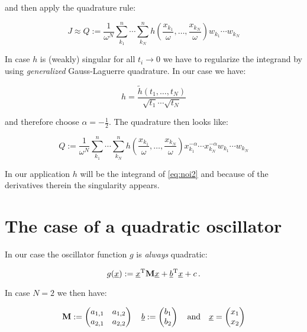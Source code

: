 \documentclass[a4paper,10pt]{article}
\begin{document}
and then apply the quadrature rule:

\begin{equation}
 J \approx Q := \frac{1}{\omega^N} \sum_{k_1}^n \cdots \sum_{k_N}^n
                h\left(\frac{x_{k_1}}{\omega}, \ldots, \frac{x_{k_N}}{\omega}\right)
                w_{k_1} \cdots w_{k_N}
\end{equation}

In case $h$ is (weakly) singular for all $t_i \rightarrow 0$ we have to regularize
the integrand by using \emph{generalized} Gauss-Laguerre quadrature. In our case
we have:

\begin{equation}
 h = \frac{\tilde{h}(t_1,\ldots,t_N)}{\sqrt{t_1}\cdots\sqrt{t_N}}
\end{equation}

and therefore choose $\alpha = -\frac{1}{2}$. The quadrature then looks like:

\begin{equation}
 Q := \frac{1}{\omega^N} \sum_{k_1}^n \cdots \sum_{k_N}^n
      h\left(\frac{x_{k_1}}{\omega}, \ldots, \frac{x_{k_N}}{\omega}\right)
      x_{k_1}^{-\alpha} \cdots x_{k_N}^{-\alpha}
      w_{k_1} \cdots w_{k_N}
\end{equation}

In our application $h$ will be the integrand of \eqref{eq:noi2} and because
of the derivatives therein the singularity appears.


\section{The case of a quadratic oscillator}

In our case the oscillator function $g$ is \emph{always} quadratic:

\begin{equation}
 g(\underline{x}) := \underline{x}{}^{\textnormal{T}} \mathbf{M} \underline{x} + \underline{b}{}^{\textnormal{T}} \underline{x} +c \,.
\end{equation}

In case $N=2$ we then have:

\begin{equation}
  \mathbf{M} :=
 \begin{pmatrix}
  a_{1,1} & a_{1,2} \\
  a_{2,1} & a_{2,2}
 \end{pmatrix}
 \quad
 \underline{b} :=
 \begin{pmatrix}
  b_1 \\ b_2
 \end{pmatrix}
 \quad \mathrm{and} \quad
 \underline{x} =
 \begin{pmatrix}
  x_1 \\ x_2
 \end{pmatrix}
\end{equation}
\end{document}
